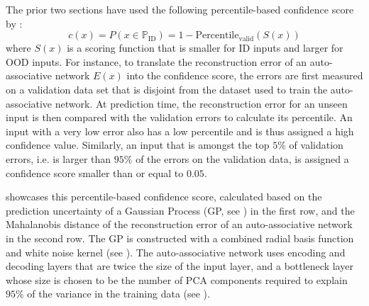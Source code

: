 The prior two sections have used the following percentile-based confidence score by \textcite{dime-detector-2021}:
\begin{equation*}
    c(x) = P(x \in \mathbb{P}_{\text{ID}}) = 1 - \text{Percentile}_{\text{valid}}(S(x))
\end{equation*}
where $S(x)$ is a scoring function that is smaller for ID inputs and larger for OOD inputs. For instance, to translate the reconstruction error of an auto-associative network $E(x)$ into the confidence score, the errors are first measured on a validation data set that is disjoint from the dataset used to train the auto-associative network. At prediction time, the reconstruction error for an unseen input is then compared with the validation errors to calculate its percentile. An input with a very low error also has a low percentile and is thus assigned a high confidence value. Similarly, an input that is amongst the top $5\%$ of validation errors, i.e. is larger than $95\%$ of the errors on the validation data, is assigned a confidence score smaller than or equal to $0.05$.

\newpar {} showcases this percentile-based confidence score, calculated based on the prediction uncertainty of a Gaussian Process (GP, see ) in the first row, and the Mahalanobis distance of the reconstruction error of an auto-associative network in the second row. The GP is constructed with a combined radial basis function and white noise kernel (see ). The auto-associative network uses encoding and decoding layers that are twice the size of the input layer, and a bottleneck layer whose size is chosen to be the number of PCA components required to explain $95\%$ of the variance in the training data (see ).

